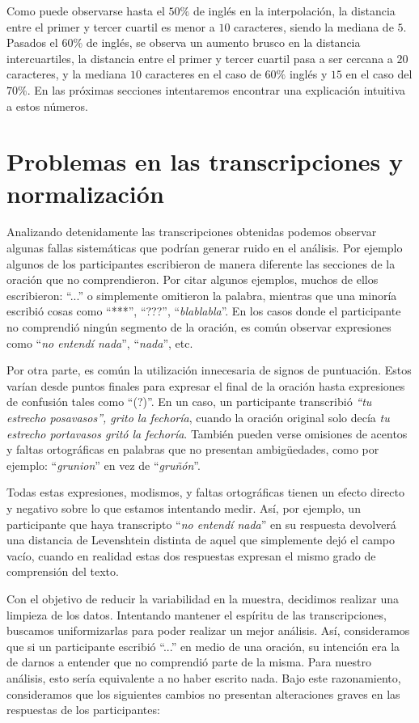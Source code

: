 Como puede observarse hasta el $50\%$ de inglés en la interpolación, la distancia entre el primer y tercer cuartil es menor a $10$ caracteres, siendo la mediana de $5$. Pasados el $60\%$ de inglés, se observa un aumento brusco en la distancia intercuartiles, la distancia entre el primer y tercer cuartil pasa a ser cercana a $20$ caracteres, y la mediana $10$ caracteres en el caso de $60\%$ inglés y $15$ en el caso del $70\%$. En las próximas secciones intentaremos encontrar una explicación intuitiva a estos números.

\section{Problemas en las transcripciones y normalización}\label{transcriptProblemsAndNorm}

Analizando detenidamente las transcripciones obtenidas podemos observar algunas fallas sistemáticas que podrían generar ruido en el análisis. Por ejemplo algunos de los participantes escribieron de manera diferente las secciones de la oración que no comprendieron. Por citar algunos ejemplos, muchos de ellos escribieron: ``...'' o simplemente omitieron la palabra, mientras que una minoría escribió cosas como ``***'', ``???'', ``\textit{blablabla}''. En los casos donde el participante no comprendió ningún segmento de la oración, es común observar expresiones como ``\textit{no entendí nada}'', ``\textit{nada}'', etc.

Por otra parte, es común la utilización innecesaria de signos de puntuación. Estos varían desde puntos finales para expresar el final de la oración hasta expresiones de confusión tales como ``(?)''. En un caso, un participante transcribió \textit{``tu estrecho posavasos'', grito la fechoría}, cuando la oración original solo decía \textit{tu estrecho portavasos gritó la fechoría}.
También pueden verse omisiones de acentos y faltas ortográficas en palabras que no presentan ambigüedades, como por ejemplo: ``\textit{grunion}'' en vez de ``\textit{gruñón}''.

Todas estas expresiones, modismos, y faltas ortográficas tienen un efecto directo y negativo sobre lo que estamos intentando medir. Así, por ejemplo, un participante que haya transcripto ``\textit{no entendí nada}'' en su respuesta devolverá una distancia de Levenshtein distinta de aquel que simplemente dejó el campo vacío, cuando en realidad estas dos respuestas expresan el mismo grado de comprensión del texto.

Con el objetivo de reducir la variabilidad en la muestra, decidimos realizar una limpieza de los datos. Intentando mantener el espíritu de las transcripciones, buscamos uniformizarlas para poder realizar un mejor análisis. Así, consideramos que si un participante escribió ``...'' en medio de una oración, su intención era la de darnos a entender que no comprendió parte de la misma. Para nuestro análisis, esto sería equivalente a no haber escrito nada. Bajo este razonamiento, consideramos que los siguientes cambios no presentan alteraciones graves en las respuestas de los participantes:

